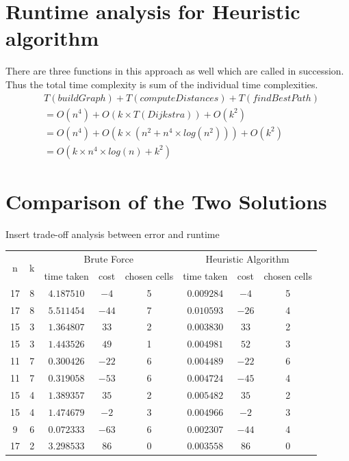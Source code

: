 \documentclass[12pt]{report}
\begin{document}
\section{Runtime analysis for Heuristic algorithm}
There are three functions in this approach as well which are called in succession. Thus the total time complexity is sum of the individual time complexities.
\begin{equation}
\begin{aligned}
    &T({buildGraph}) + T({computeDistances}) + T({findBestPath})\\
    &= O(n^4) + O(k \times T({Dijkstra})) + O(k^2)\\
    &= O(n^4) + O(k \times (n^2 + n^4 \times log(n^2))) + O(k^2)\\
    &= O(k \times n^4 \times log(n) + k^2)
\end{aligned}
\end{equation}

\section{Comparison of the Two Solutions}
Insert trade-off analysis between error and runtime

\begin{center}
\begin{tabular}{ |c|c||c|c|c|c|c|c| } 
 \hline
 \multirow{2}{*}{n} &
 \multirow{2}{*}{k} & \multicolumn{3}{|c|}{Brute Force} & \multicolumn{3}{|c|}{Heuristic Algorithm}\\
 \cline{3-8}
 & & time taken & cost & chosen cells
 &time taken & cost & chosen cells\\
 \hline\hline
 17 & 8 & $4.187510$ & $-4$ & 5 & $0.009284$ & $-4$ & 5\\
 \hline
 17 & 8 & $5.511454$& $-44$ & 7 & $0.010593$& $-26$& 4\\ 
 \hline
 15 & 3 & $1.364807$ & $33$  & 2& $0.003830$& $33$ & 2\\ 
 \hline
 15 & 3 & $1.443526$& $49$ & 1  & $0.004981$& $52$ & 3\\  
 \hline
 11 & 7 & $0.300426$& $-22$& 6  & $0.004489$& $-22$ &6\\  
 \hline
 11 & 7 & $0.319058$& $-53$  & 6 & $0.004724$& $-45$&4\\
 \hline 
 15 & 4 & $1.389357$& $35$ & 2 & $0.005482$& $35$& 2\\  
 \hline
 15 & 4 & $1.474679$& $-2$ & 3 & $0.004966$& $-2$& 3 \\  
 \hline
 9 & 6 & $0.072333$& $-63$ & 6 & $0.002307$& $-44$& 4 \\  %
 \hline
 17 & 2 & $3.298533$& $86$ & 0& $0.003558$& $86$&0 \\  %
 \hline
 
\end{tabular}
\end{center}
\end{document}
